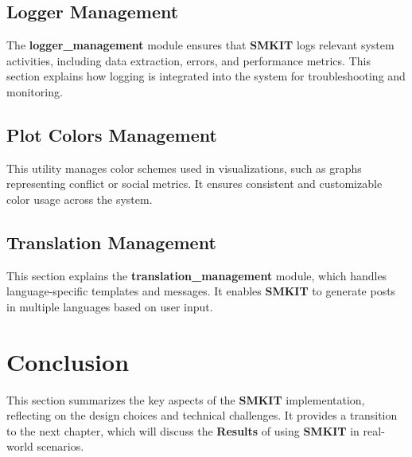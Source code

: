 \subsection{Logger Management}
\label{subsec:logger_management}
The \textbf{logger\_management} module ensures that \textbf{SMKIT} logs relevant system activities, including data extraction, errors, and performance metrics. This section explains how logging is integrated into the system for troubleshooting and monitoring.

\subsection{Plot Colors Management}
\label{subsec:plot_colors_management}
This utility manages color schemes used in visualizations, such as graphs representing conflict or social metrics. It ensures consistent and customizable color usage across the system.

\subsection{Translation Management}
\label{subsec:translation_management}
This section explains the \textbf{translation\_management} module, which handles language-specific templates and messages. It enables \textbf{SMKIT} to generate posts in multiple languages based on user input.

\section{Conclusion}
\label{sec:implementation_conclusion}
This section summarizes the key aspects of the \textbf{SMKIT} implementation, reflecting on the design choices and technical challenges. It provides a transition to the next chapter, which will discuss the \textbf{Results} of using \textbf{SMKIT} in real-world scenarios.
